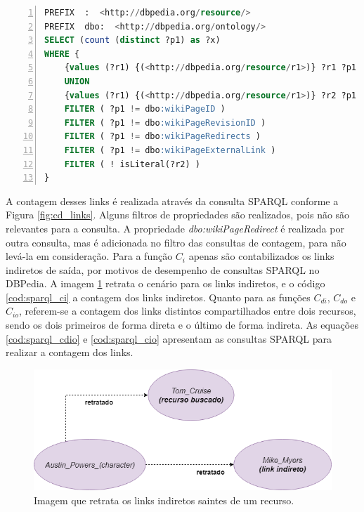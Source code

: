 \begin{lstlisting}[caption=Consulta SPARQL para contagem de links diretos, language=SQL, frame=single, label={cod:sparql_cd}, float, numbers=left]
PREFIX  :  <http://dbpedia.org/resource/>
PREFIX  dbo:  <http://dbpedia.org/ontology/>
SELECT (count (distinct ?p1) as ?x)
WHERE {
	{values (?r1) {(<http://dbpedia.org/resource/r1>)} ?r1 ?p1 ?r2 . FILTER (?r1 != ?r2)}
	UNION
	{values (?r1) {(<http://dbpedia.org/resource/r1>)} ?r2 ?p1 ?r1 . FILTER (?r1 != ?r2)}
	FILTER ( ?p1 != dbo:wikiPageID )
	FILTER ( ?p1 != dbo:wikiPageRevisionID )
	FILTER ( ?p1 != dbo:wikiPageRedirects )
	FILTER ( ?p1 != dbo:wikiPageExternalLink )
	FILTER ( ! isLiteral(?r2) )
}
\end{lstlisting}

A contagem desses links é realizada através da consulta \ac{SPARQL} conforme a Figura \ref{fig:cd_links}. Alguns filtros de propriedades são realizados, pois não são relevantes para a consulta. A propriedade \textit{dbo:wikiPageRedirect} é realizada por outra consulta, mas é adicionada no filtro das consultas de contagem, para não levá-la em consideração. Para a função $C_i$ apenas são contabilizados os links indiretos de saída, por motivos de desempenho de consultas SPARQL no DBPedia. A imagem \ref{fig:ci_links} retrata o cenário para os links indiretos, e o código \ref{cod:sparql_ci} a contagem dos links indiretos. Quanto para as funções $C_{di}$, $C_{do}$ e $C_{io}$, referem-se a contagem dos links distintos compartilhados entre dois recursos, sendo os dois primeiros de forma direta e o último de forma indireta. As equações \ref{cod:sparql_cdio} e \ref{cod:sparql_cio} apresentam as consultas \ac{SPARQL} para realizar a contagem dos links.

\begin{figure}
	\centering
	\includegraphics[scale=0.5]{imagens/ci_links.png}
	\caption{Imagem que retrata os links indiretos saintes de um recurso.}
	\label{fig:ci_links}
\end{figure}

